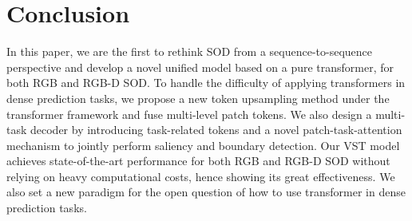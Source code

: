 \documentclass[10pt,twocolumn,letterpaper]{article}
\begin{document}
\section{Conclusion}

In this paper, we are the first to rethink SOD from a sequence-to-sequence perspective and develop a novel unified model based on a pure transformer, for both RGB and RGB-D SOD. To handle the difficulty of applying transformers in dense prediction tasks, we propose a new token upsampling method under the transformer framework and fuse multi-level patch tokens. We also design a multi-task decoder by introducing task-related tokens and a novel patch-task-attention mechanism to jointly perform saliency and boundary detection. Our VST model achieves state-of-the-art performance for both RGB and RGB-D SOD without relying on heavy computational costs, hence showing its great effectiveness. We also set a new paradigm for the open question of how to use transformer in dense prediction tasks. 

{\small


}

\clearpage
\end{document}
